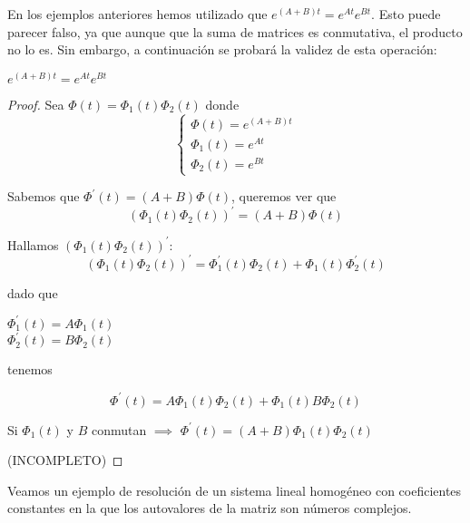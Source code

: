 \documentclass{mathnotes}
\begin{document}
En los ejemplos anteriores hemos utilizado que $e^{(A+B)t} = e^{At}e^{Bt}$. Esto puede parecer falso, ya que aunque que la suma de matrices es conmutativa, el producto no lo es. Sin embargo, a continuación se probará la validez de esta operación:

\begin{theorem}
$e^{(A+B)t} = e^{At}e^{Bt}$
\end{theorem}
\begin{proof}
Sea $\Phi(t) = \Phi_1(t)\Phi_2(t)$ donde 
\begin{equation*}
  \left\lbrace
  \begin{array}{l}
  	\Phi(t) = e^{(A+B)t}\\
	\Phi_1(t) = e^{At}\\
	\Phi_2(t) = e^{Bt}
  \end{array}
  \right.
\end{equation*}

Sabemos que $\Phi^\prime(t) = (A+B)\Phi(t)$, queremos ver que $$(\Phi_1(t)\Phi_2(t))^\prime = (A+B)\Phi(t)$$

Hallamos $(\Phi_1(t)\Phi_2(t))^\prime$:
$$(\Phi_1(t)\Phi_2(t))^\prime = \Phi^\prime_1(t)\Phi_2(t)+\Phi_1(t)\Phi^\prime_2(t)$$

dado que \begin{center}
$\Phi^\prime_1(t) = A\Phi_1(t)$\\
$\Phi^\prime_2(t) = B\Phi_2(t)$
\end{center}

tenemos

$$\Phi^\prime(t) = A\Phi_1(t)\Phi_2(t)+\Phi_1(t)B\Phi_2(t)$$

Si $\Phi_1(t)$ y $B$ conmutan $\implies$ $\Phi^\prime(t) = (A+B)\Phi_1(t)\Phi_2(t)$

(INCOMPLETO)
\end{proof}

Veamos un ejemplo de resolución de un sistema lineal homogéneo con coeficientes constantes en la que los autovalores de la matriz son números complejos.
\end{document}
